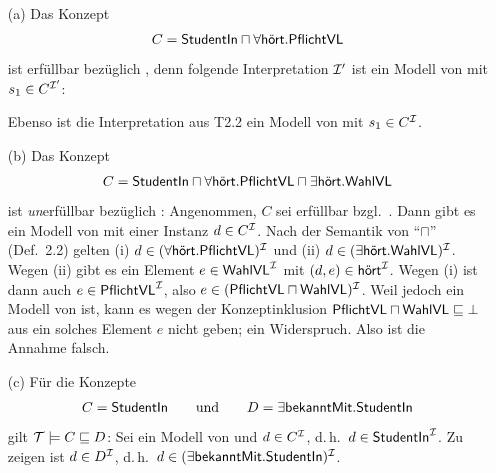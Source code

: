 \documentclass[fontsize=11pt, twoside=false, numbers=autoenddot]{scrbook}
\begin{document}
\begin{enumerate}
  \item[(a)]
    Das Konzept
    \[
      C = \textsf{StudentIn} \sqcap \forall\textsf{hört}.\textsf{PflichtVL}
    \]
    ist erfüllbar bezüglich \Tmc, denn folgende Interpretation 
    $\mathcal{I}'$ ist ein Modell von \Tmc mit $s_1 \in C^{\mathcal{I}'}$:
    \begin{center}
    \end{center}
    Ebenso ist die Interpretation \Imc aus T2.2 ein Modell von \Tmc mit $s_1 \in C^\mathcal{I}$.
    \parII
  \item[(b)]
    Das Konzept
    \[
      C = \textsf{StudentIn} \sqcap \forall\textsf{hört}.\textsf{PflichtVL} \sqcap \exists\textsf{hört}.\textsf{WahlVL}
    \]
    ist \emph{un}erfüllbar bezüglich \Tmc:
    Angenommen, $C$ sei erfüllbar bzgl.\ \Tmc.
    Dann gibt es ein Modell \Imc von \Tmc mit einer Instanz $d \in C^\mathcal{I}$.
    Nach der Semantik von "`$\sqcap$"' (Def.~2.2) gelten
    (i) $d \in (\forall\textsf{hört}.\textsf{PflichtVL})^\mathcal{I}$ und
    (ii) $d \in (\exists\textsf{hört}.\textsf{WahlVL})^\mathcal{I}$.
    Wegen (ii) gibt es ein Element $e \in \textsf{WahlVL}^\mathcal{I}$ mit $(d,e) \in \textsf{hört}^\mathcal{I}$.
    Wegen (i) ist dann auch $e \in \textsf{PflichtVL}^\mathcal{I}$,
    also $e \in (\textsf{PflichtVL} \sqcap \textsf{WahlVL})^\mathcal{I}$.
    Weil \Imc jedoch ein Modell von \Tmc ist,
    kann es wegen der Konzeptinklusion $\textsf{PflichtVL} \sqcap \textsf{WahlVL} \sqsubseteq \bot$
    aus \Tmc ein solches Element $e$ nicht geben; ein Widerspruch.
    Also ist die Annahme falsch.
    \parII
  \item[(c)]
    Für die Konzepte
    \[
      C = \textsf{StudentIn}
      \qquad\text{und}\qquad
      D = \exists\textsf{bekanntMit}.\textsf{StudentIn}
    \]
    gilt $\mathcal{T} \models C \sqsubseteq D$:
    Sei \Imc ein Modell von \Tmc und $d \in C^\mathcal{I}$, d.\,h.\ $d \in \textsf{StudentIn}^\mathcal{I}$.
    Zu zeigen ist $d \in D^\mathcal{I}$, d.\,h.\ $d \in (\exists\textsf{bekanntMit}.\textsf{StudentIn})^\mathcal{I}$.
    

\end{enumerate}
\end{document}
